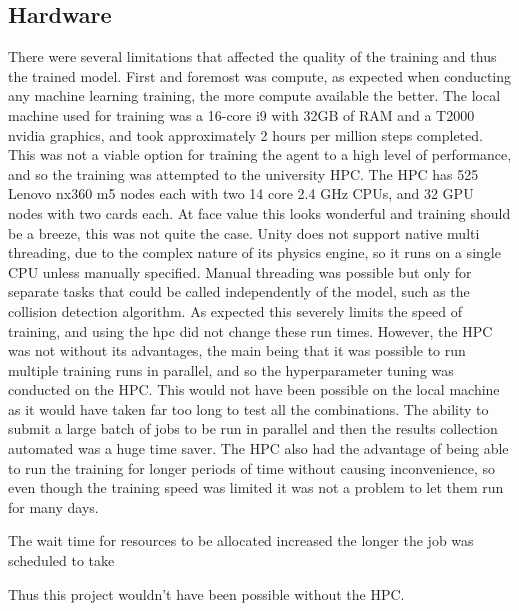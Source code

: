 \subsection{Hardware}\label{sec:hardware_evaluation}
There were several limitations that affected the quality of the training and thus the trained model. First and foremost was compute, as expected when conducting any machine learning training, the more compute available the better. The local machine used for training was a 16-core i9 with 32GB of RAM and a T2000 nvidia graphics, and took approximately 2 hours per million steps completed. This was not a viable option for training the agent to a high level of performance, and so the training was attempted to the university HPC. The HPC has 525 Lenovo nx360 m5 nodes each with two 14 core 2.4 GHz CPUs, and 32 GPU nodes with two cards each. At face value this looks wonderful and training should be a breeze, this was not quite the case. Unity does not support native multi threading, due to the complex nature of its physics engine, so it runs on a single CPU unless manually specified. Manual threading was possible but only for separate tasks that could be called independently of the model, such as the collision detection algorithm. As expected this severely limits the speed of training, and using the hpc did not change these run times.
However, the HPC was not without its advantages, the main being that it was possible to run multiple training runs in parallel, and so the hyperparameter tuning was conducted on the HPC. This would not have been possible on the local machine as it would have taken far too long to test all the combinations. The ability to submit a large batch of jobs to be run in parallel and then the results collection automated was a huge time saver. The HPC also had the advantage of being able to run the training for longer periods of time without causing inconvenience, so even though the training speed was limited it was not a problem to let them run for many days. 

The wait time for resources to be allocated increased the longer the job was scheduled to take 


Thus this project wouldn't have been possible without the HPC.




